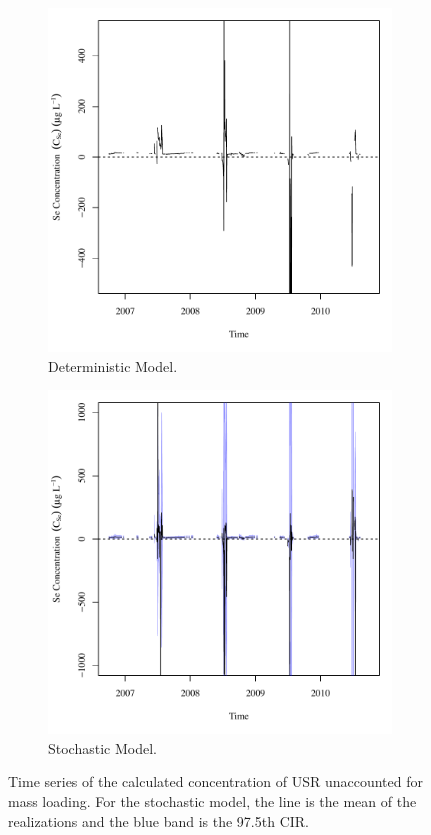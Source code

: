 \begin{linenumbers}
\begin{figure}[htbp]
\centering
	\begin{subfigure}{0.5\textwidth}
		\centering
		\includegraphics[width=0.9\linewidth]{"Figures/Results_DSR/Deterministic/Balance C"}
		\caption{Deterministic Model.}
	\end{subfigure}%
	\begin{subfigure}{0.5\textwidth}
		\centering
		\includegraphics[width=0.9\linewidth]{"Figures/Results_DSR/Stochastic/Balance C"}
		\caption{Stochastic Model.}
	\end{subfigure}
	\caption[Time series of the calculated concentration of USR unaccounted for mass loading.]{Time series of the calculated concentration of USR unaccounted for mass loading.  For the stochastic model, the line is the mean of the realizations and the blue band is the 97.5th CIR.}
	\label{fig:DSRConc}
\end{figure}


\end{linenumbers}
